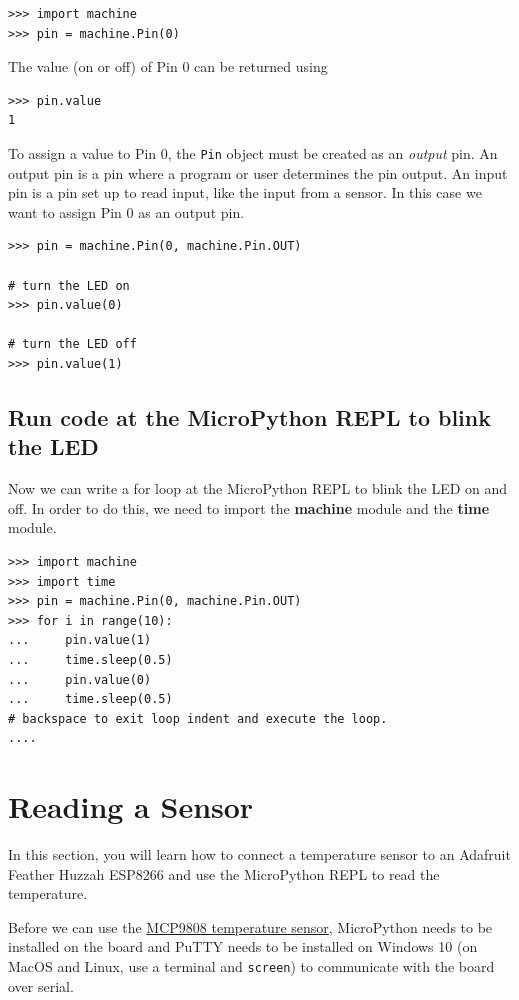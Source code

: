 \documentclass{book}
\begin{document}
\begin{lstlisting}
>>> import machine
>>> pin = machine.Pin(0)
\end{lstlisting}

The value (on or off) of Pin 0 can be returned using

\begin{lstlisting}
>>> pin.value
1
\end{lstlisting}

To assign a value to Pin 0, the \lstinline!Pin! object must be created
as an \emph{output} pin. An output pin is a pin where a program or user
determines the pin output. An input pin is a pin set up to read input,
like the input from a sensor. In this case we want to assign Pin 0 as an
output pin.

\begin{lstlisting}
>>> pin = machine.Pin(0, machine.Pin.OUT)

# turn the LED on
>>> pin.value(0)

# turn the LED off
>>> pin.value(1)
\end{lstlisting}

    \subsection{Run code at the MicroPython REPL to blink the
LED}\label{run-code-at-the-micropython-repl-to-blink-the-led}

    Now we can write a for loop at the MicroPython REPL to blink the LED on
and off. In order to do this, we need to import the \textbf{machine}
module and the \textbf{time} module.

    \begin{lstlisting}
>>> import machine
>>> import time
>>> pin = machine.Pin(0, machine.Pin.OUT)
>>> for i in range(10):
...     pin.value(1)
...     time.sleep(0.5)
...     pin.value(0)
...     time.sleep(0.5)
# backspace to exit loop indent and execute the loop.
.... 
\end{lstlisting}

    \section{Reading a Sensor}\label{reading-a-sensor}

    In this section, you will learn how to connect a temperature sensor to
an Adafruit Feather Huzzah ESP8266 and use the MicroPython REPL to read
the temperature.

Before we can use the
\href{https://www.adafruit.com/product/1782}{MCP9808 temperature
sensor}, MicroPython needs to be installed on the board and PuTTY needs
to be installed on Windows 10 (on MacOS and Linux, use a terminal and
\lstinline!screen!) to communicate with the board over serial.
\end{document}
